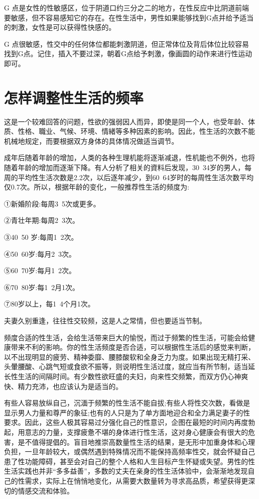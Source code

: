 \documentclass[12pt,UTF8]{ctexbook}
\begin{document}
G 点是女性的性敏感区，位于阴道口约三分之二的地方，在性反应中比阴道前端要敏感，但不容易感知它的存在。在性生活中，男性如果能够找到G点并给予适当的刺激，女性是可以获得性快感的。

G 点很敏感，性交中的任何体位都能刺激阴道，但正常体位及背后体位比较容易找到G点。记住，插入不要过深，朝着G点给予刺激，像画圆的动作来进行性运动即可。

\section{怎样调整性生活的频率}

这是一个较难回答的问题，性欲的强弱因人而异，即使是同一个人，也受年龄、体质、性格、職业、气候、环境、情緒等多种因素的影响。因此，性生活的次数不能机械地规定，而要根据双方身体的具体情况做适当调节。

成年后随着年龄的增加，人类的各种生理机能将逐渐减退，性机能也不例外，也将随着年龄的增加而逐渐下降。有人分析了相关的資料后发现，30~34岁的男人，每周的平均性生活次数是2.2次，以后逐年减少，到60~64岁时的每周性生活次数平均仅0.7次。所以，根据年龄的变化，一般推荐性生活的频度为:

①新婚阶段:每周3~5次或更多。

②青壮年期:每周2~3次。

③40~50 岁:每周1~2次。

④50~60岁:每月2~3次。

⑤60~70岁:每月1~2次。

⑥70~80岁:每1~2月1次。

⑦80岁以上，每1~4个月1次。

夫妻久别重逢，往往性交较频，这是人之常情，但也要适当节制。

频度合适的性生活，会给生活带来巨大的愉悦，而过于频繁的性生活，可能会给健康带来不利的影响。你的性生活频度是否合适，可以根据性生活后的感觉来判断，以不出现明显的疲劳、精神委靡、腰膝酸软和全身乏力为度。如果出现无精打采、头暈腰酸、心跳气短或食欲不振等，则说明性生活过度，就应当有所节制，适当延长性生活的间隔时间。有少数性欲旺盛的夫妇，向来性交频繁，而双方仍心神爽快、精力充沛，也应该认为是适当的。

有些人容易放纵自己，沉湎于频繁的性生活不能自拔;有些人将性交次数，看做是显示男人力量和尊严的象征;也有的人只是为了单方面地迎合和全力满足妻子的性要求。因此，这些人极其容易过分强化自己的性意识，企图在最短的时间内再度勃起，用意志的力量，支撑疲惫不堪的身体进行性生活，这对身心健康会有很大的危害，是不值得提倡的。盲目地推崇高数量性生活的结果，是无形中加重身体和心理负担，一旦年龄较大，或偶然遇到特殊情况而不能保持高频率性交，就会怀疑自己患了性功能障碍，甚至会对自己的整个人格和人生目标产生怀疑或失望。男性的性生活实践也并非“多多益善”，多数的丈夫在亲身的性生活体验中，会渐渐地发现自己的性需求，实际上在悄悄地变化，从需要大数量转为寻求高品质，希望获得更深切的情感交流和体验。
\end{document}
